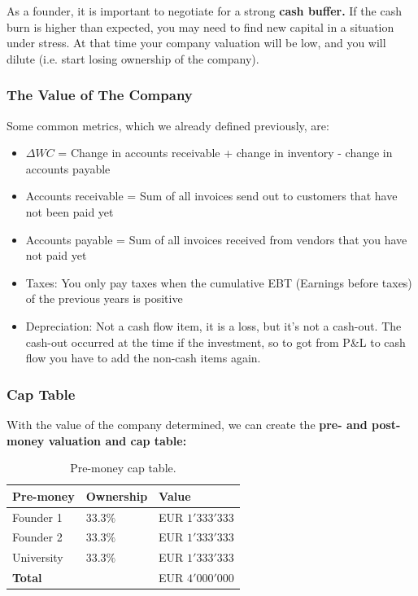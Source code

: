 \documentclass[a4paper]{extarticle}
\begin{document}
As a founder, it is important to negotiate for a strong \textbf{cash buffer.} If the cash burn is higher than expected, you may need to find new capital in a situation under stress. At that time your company valuation will be low, and you will dilute (i.e. start losing ownership of the company).

\subsubsection{The Value of The Company}

Some common metrics, which we already defined previously, are:

\begin{itemize}
    \item \(\Delta WC\) = Change in accounts receivable + change in inventory - change in accounts payable
    \item Accounts receivable = Sum of all invoices send out to customers that have not been paid yet
    \item Accounts payable = Sum of all invoices received from vendors that you have not paid yet
    \item Taxes: You only pay taxes when the cumulative EBT (Earnings before taxes) of the previous years is positive
    \item Depreciation: Not a cash flow item, it is a loss, but it's not a cash-out. The cash-out occurred at the time if the investment, so to got from P\&L to cash flow you have to add the non-cash items again.
\end{itemize}

\subsubsection{Cap Table}

With the value of the company determined, we can create the \textbf{pre- and post-money valuation and cap table:}

\begin{table}[H]
    \centering
    \begin{tabular}{|l|l|l|}
    \hline
    \textbf{Pre-money} & \textbf{Ownership} & \textbf{Value}  \\ \hline
    Founder 1          & $33.3\%$           & EUR $1'333'333$ \\ \hline
    Founder 2          & $33.3\%$           & EUR $1'333'333$ \\ \hline
    University         & $33.3\%$           & EUR $1'333'333$ \\ \hline
    \textbf{Total}     &                    & EUR $4'000'000$ \\ \hline
    \end{tabular}
    \caption{Pre-money cap table.}
    \label{tab:cap-table-01-pre-money}
 \end{table}
\end{document}
